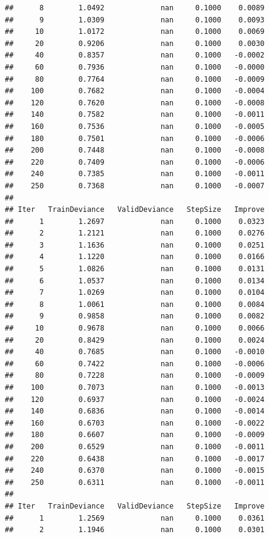 \documentclass[]{book}
\begin{document}
\begin{verbatim}
##      8        1.0492             nan     0.1000    0.0089
##      9        1.0309             nan     0.1000    0.0093
##     10        1.0172             nan     0.1000    0.0069
##     20        0.9206             nan     0.1000    0.0030
##     40        0.8357             nan     0.1000   -0.0002
##     60        0.7936             nan     0.1000   -0.0000
##     80        0.7764             nan     0.1000   -0.0009
##    100        0.7682             nan     0.1000   -0.0004
##    120        0.7620             nan     0.1000   -0.0008
##    140        0.7582             nan     0.1000   -0.0011
##    160        0.7536             nan     0.1000   -0.0005
##    180        0.7501             nan     0.1000   -0.0006
##    200        0.7448             nan     0.1000   -0.0008
##    220        0.7409             nan     0.1000   -0.0006
##    240        0.7385             nan     0.1000   -0.0011
##    250        0.7368             nan     0.1000   -0.0007
## 
## Iter   TrainDeviance   ValidDeviance   StepSize   Improve
##      1        1.2697             nan     0.1000    0.0323
##      2        1.2121             nan     0.1000    0.0276
##      3        1.1636             nan     0.1000    0.0251
##      4        1.1220             nan     0.1000    0.0166
##      5        1.0826             nan     0.1000    0.0131
##      6        1.0537             nan     0.1000    0.0134
##      7        1.0269             nan     0.1000    0.0104
##      8        1.0061             nan     0.1000    0.0084
##      9        0.9858             nan     0.1000    0.0082
##     10        0.9678             nan     0.1000    0.0066
##     20        0.8429             nan     0.1000    0.0024
##     40        0.7685             nan     0.1000   -0.0010
##     60        0.7422             nan     0.1000   -0.0006
##     80        0.7228             nan     0.1000   -0.0009
##    100        0.7073             nan     0.1000   -0.0013
##    120        0.6937             nan     0.1000   -0.0024
##    140        0.6836             nan     0.1000   -0.0014
##    160        0.6703             nan     0.1000   -0.0022
##    180        0.6607             nan     0.1000   -0.0009
##    200        0.6529             nan     0.1000   -0.0011
##    220        0.6438             nan     0.1000   -0.0017
##    240        0.6370             nan     0.1000   -0.0015
##    250        0.6311             nan     0.1000   -0.0011
## 
## Iter   TrainDeviance   ValidDeviance   StepSize   Improve
##      1        1.2569             nan     0.1000    0.0361
##      2        1.1946             nan     0.1000    0.0301

\end{verbatim}
\end{document}
